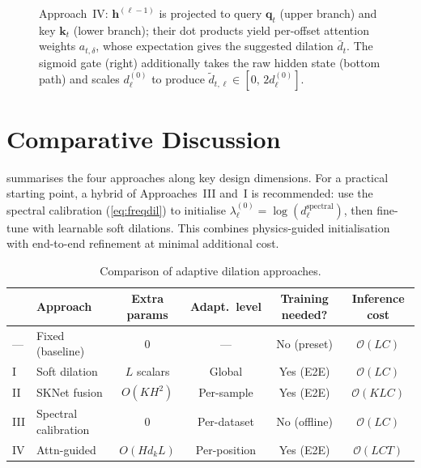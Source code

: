 \documentclass[12pt,a4paper]{article}
\newcommand{\hv}{\mathbf{h}}
\begin{document}
\begin{figure}[ht]
  \caption{Approach~IV: $\hv^{(\ell-1)}$ is projected to query $\mathbf{q}_t$
           (upper branch) and key $\mathbf{k}_t$ (lower branch); their dot
           products yield per-offset attention weights $a_{t,\delta}$, whose
           expectation gives the suggested dilation $\bar{d}_t$. The sigmoid
           gate (right) additionally takes the raw hidden state (bottom path)
           and scales $d_\ell^{(0)}$ to produce $\tilde{d}_{t,\ell}\in
           [0,\,2d_\ell^{(0)}]$.}
  \label{fig:approach4}
\end{figure}

\section{Comparative Discussion}

 summarises the four approaches along key design
dimensions. For a practical starting point, a hybrid of Approaches~III and~I
is recommended: use the spectral calibration (\cref{eq:freqdil}) to initialise
$\lambda_\ell^{(0)} = \log(d_\ell^{\text{spectral}})$, then fine-tune with
learnable soft dilations. This combines physics-guided initialisation with
end-to-end refinement at minimal additional cost.

\vspace{6pt}

\begin{table}[ht]
  \centering
  \caption{Comparison of adaptive dilation approaches.}
  \label{tab:comparison}
  \setlength{\tabcolsep}{6pt}
  \renewcommand{\arraystretch}{1.3}
  \begin{tabular}{@{}llcccc@{}}
    \toprule
    & \textbf{Approach}
      & \textbf{Extra params}
      & \textbf{Adapt.\ level}
      & \textbf{Training needed?}
      & \textbf{Inference cost} \\
    \midrule
    ---   & Fixed (baseline)    & 0             & ---           & No (preset)   & $\mathcal{O}(LC)$ \\
    I     & Soft dilation       & $L$ scalars   & Global        & Yes (E2E)     & $\mathcal{O}(LC)$ \\
    II    & SKNet fusion        & $O(KH^2)$     & Per-sample    & Yes (E2E)     & $\mathcal{O}(KLC)$ \\
    III   & Spectral calibration& 0             & Per-dataset   & No (offline)  & $\mathcal{O}(LC)$ \\
    IV    & Attn-guided         & $O(H d_k L)$  & Per-position  & Yes (E2E)     & $\mathcal{O}(LCT)$ \\
    \bottomrule
  \end{tabular}
\end{table}
\end{document}
